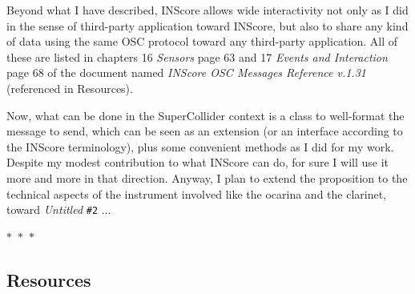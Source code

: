 \documentclass{article}
\begin{document}
Beyond what I have described, INScore allows wide interactivity not only as I did in the sense of third-party application toward INScore, but also to share any kind of data using the same OSC protocol toward any third-party application. All of these are listed in chapters 16 \textit{Sensors} page 63 and 17 \textit{Events and Interaction} page 68 of the document named \textit{INScore OSC Messages Reference v.1.31} (referenced in Resources).

Now, what can be done in the SuperCollider context is a class to well-format the message to send, which can be seen as an extension (or an interface according to the INScore terminology), plus some convenient methods as I did for my work. 
Despite my modest contribution to what INScore can do, for sure I will use it more and more in that direction. Anyway,
I plan to extend the proposition to the technical aspects of the instrument involved like the ocarina and the clarinet, toward 
\textit{Untitled} \texttt{\#2} ...

\begin{center}
  $\ast$~$\ast$~$\ast$
\end{center}

\subsection*{Resources}
\end{document}
